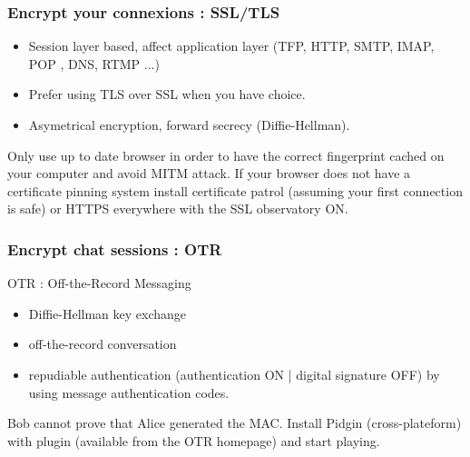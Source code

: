 \begin{frame}
\frametitle{Encrypt your connexions : SSL/TLS}
\begin{itemize}
\item Session layer based, affect application layer (TFP, HTTP, SMTP, IMAP, POP
, DNS, RTMP ...)
\item Prefer using TLS over SSL when you have choice.
\item Asymetrical encryption, forward secrecy (Diffie-Hellman).
\end{itemize}

Only use up to date browser in order to have the correct fingerprint cached
on your computer and avoid MITM attack.
If your browser does not have a certificate pinning system install
certificate patrol (assuming your first connection is safe) or HTTPS everywhere
with the SSL observatory ON.
\end{frame}

\begin{frame}
\frametitle{Encrypt chat sessions : OTR}
\begin{block}{OTR : Off-the-Record Messaging}
\begin{itemize}
\item Diffie-Hellman key exchange
\item off-the-record conversation
\item repudiable authentication (authentication ON | digital signature OFF)
by using message authentication codes.
\end{itemize}
\end{block}
Bob cannot prove that Alice generated the MAC.
Install Pidgin (cross-plateform) with plugin (available from the OTR homepage)
and start playing.
\end{frame}
